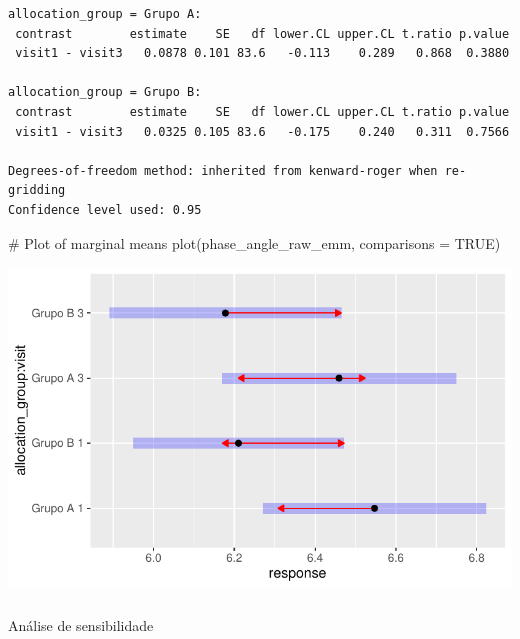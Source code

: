 \documentclass[
  12pt,
]{article}
\makeatletter
\let\oldsubparagraph\subparagraph
\renewcommand{\subparagraph}{
    \@ifstar
      \xxxSubParagraphStar
      \xxxSubParagraphNoStar
  }
\newcommand{\xxxSubParagraphStar}[1]{\oldsubparagraph*{#1}\mbox{}}
\newcommand{\xxxSubParagraphNoStar}[1]{\oldsubparagraph{#1}\mbox{}}
\newenvironment{Shaded}{\begin{snugshade}}{\end{snugshade}}
\newcommand{\AttributeTok}[1]{\textcolor[rgb]{0.40,0.45,0.13}{#1}}
\newcommand{\CommentTok}[1]{\textcolor[rgb]{0.37,0.37,0.37}{#1}}
\newcommand{\ConstantTok}[1]{\textcolor[rgb]{0.56,0.35,0.01}{#1}}
\newcommand{\FunctionTok}[1]{\textcolor[rgb]{0.28,0.35,0.67}{#1}}
\newcommand{\NormalTok}[1]{\textcolor[rgb]{0.00,0.23,0.31}{#1}}
\makeatother
\begin{document}
\begin{verbatim}
allocation_group = Grupo A:
 contrast        estimate    SE   df lower.CL upper.CL t.ratio p.value
 visit1 - visit3   0.0878 0.101 83.6   -0.113    0.289   0.868  0.3880

allocation_group = Grupo B:
 contrast        estimate    SE   df lower.CL upper.CL t.ratio p.value
 visit1 - visit3   0.0325 0.105 83.6   -0.175    0.240   0.311  0.7566

Degrees-of-freedom method: inherited from kenward-roger when re-gridding 
Confidence level used: 0.95 
\end{verbatim}

\begin{Shaded}
\begin{Highlighting}[]
\CommentTok{\# Plot of marginal means}
\FunctionTok{plot}\NormalTok{(phase\_angle\_raw\_emm, }\AttributeTok{comparisons =} \ConstantTok{TRUE}\NormalTok{)}
\end{Highlighting}
\end{Shaded}

\includegraphics{Outcomes_files/figure-pdf/phase_angle_raw_emm-1.pdf}

\subparagraph{Análise de
sensibilidade}\label{anuxe1lise-de-sensibilidade-17}
\end{document}

